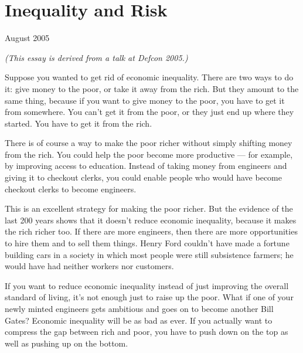 \chapter{Inequality and Risk}


            
              
                

August 2005

\emph{(This essay is derived from a talk at Defcon 2005.)}

Suppose you wanted to get rid of economic
                  inequality. There are two ways to do it: give money to the
                  poor, or take it away from the rich. But they amount to the
                  same thing, because if you want to give money to the poor, you
                  have to get it from somewhere. You can't get it from the poor,
                  or they just end up where they started. You have to get it
                  from the rich.

There is of course a way to make the
                  poor richer without simply shifting money from the rich. You
                  could help the poor become more productive --- for
                  example, by improving access to education. Instead of taking
                  money from engineers and giving it to checkout clerks, you
                  could enable people who would have become checkout clerks to
                  become engineers.

This is an excellent strategy for
                  making the poor richer. But the evidence of the last 200 years
                  shows that it doesn't reduce economic inequality, because it
                  makes the rich richer too. If there are more engineers, then
                  there are more opportunities to hire them and to sell them
                  things. Henry Ford couldn't have made a fortune building cars
                  in a society in which most people were still subsistence
                  farmers; he would have had neither workers nor customers.

If
                  you want to reduce economic inequality instead of just
                  improving the overall standard of living, it's not enough just
                  to raise up the poor. What if one of your newly minted
                  engineers gets ambitious and goes on to become another Bill
                  Gates? Economic inequality will be as bad as ever. If you
                  actually want to compress the gap between rich and poor, you
                  have to push down on the top as well as pushing up on the
                  bottom.

